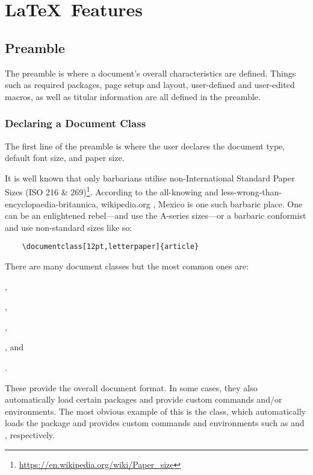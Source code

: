 \chapter{\LaTeX~Features}
%
\section{Preamble}\label{s:p}
%
The preamble is where a document's overall characteristics are
defined.  Things such as required packages, page setup and layout,
user-defined and user-edited macros, as well as titular information
are all defined in the preamble.
%
\subsection{Declaring a Document Class}
%
The first line of the preamble is where the user declares the document
type, default font size, and paper size.

It is well known that only barbarians utilise non-International
Standard Paper Sizes (ISO 216 \&
269)\footnote{\url{https://en.wikipedia.org/wiki/Paper_size}}.
According to the all-knowing and
less-wrong-than-encyclopaedia-britannica, wikipedia.org
\cite{wikipediavsbritannica1,wikipediavsbritannica2,wikipediavsbritannica3},
Mexico is one such barbaric place.  One can be an enlightened
rebel---and use the A-series sizes---or a barbaric conformist and use
non-standard sizes like so:
\begin{verbatim}
	\documentclass[12pt,letterpaper]{article}
\end{verbatim}

There are many document classes but the most common ones are:
\begin{inparaenum}[\itshape 1\upshape)]
\item {},
\item {},
\item {},
\item {}, and
\item {}.
\end{inparaenum}
These provide the overall document format.  In some cases, they also
automatically load certain packages and provide custom commands and/or
environments.  The most obvious example of this is the 
class, which automatically loads the  package and
provides custom commands and environments such as 
and , respectively.

